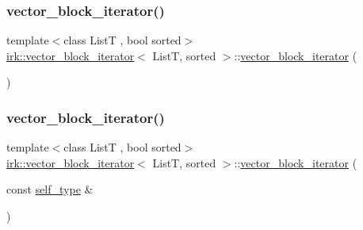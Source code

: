 \subsubsection{\texorpdfstring{vector\+\_\+block\+\_\+iterator()}{vector\_block\_iterator()}\hspace{0.1cm}{\footnotesize\ttfamily [1/3]}}
{\footnotesize\ttfamily template$<$class ListT , bool sorted$>$ \\
\mbox{\hyperlink{classirk_1_1vector__block__iterator}{irk\+::vector\+\_\+block\+\_\+iterator}}$<$ ListT, sorted $>$\+::\mbox{\hyperlink{classirk_1_1vector__block__iterator}{vector\+\_\+block\+\_\+iterator}} (\begin{DoxyParamCaption}{ }\end{DoxyParamCaption})\hspace{0.3cm}{\ttfamily [default]}}

\mbox{\label{classirk_1_1vector__block__iterator_a675b570eae64be69dff0a58aa2e30491}} 
\subsubsection{\texorpdfstring{vector\+\_\+block\+\_\+iterator()}{vector\_block\_iterator()}\hspace{0.1cm}{\footnotesize\ttfamily [2/3]}}
{\footnotesize\ttfamily template$<$class ListT , bool sorted$>$ \\
\mbox{\hyperlink{classirk_1_1vector__block__iterator}{irk\+::vector\+\_\+block\+\_\+iterator}}$<$ ListT, sorted $>$\+::\mbox{\hyperlink{classirk_1_1vector__block__iterator}{vector\+\_\+block\+\_\+iterator}} (\begin{DoxyParamCaption}\item[{const \mbox{\hyperlink{classirk_1_1vector__block__iterator_a39e5fae2a4258ea1a7cad14a66be2908}{self\+\_\+type}} \&}]{ }\end{DoxyParamCaption})\hspace{0.3cm}{\ttfamily [default]}}

\mbox{\label{classirk_1_1vector__block__iterator_a7e13b6d84896fcd0c31c090ddd634c45}} 
